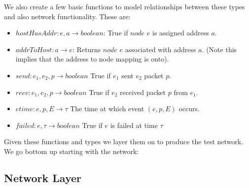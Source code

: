We also create a few basic functions to model relationships between these types and also network functionality. These
are:
\begin{itemize}
\item $hostHasAddr: e, a \rightarrow boolean$: True if $node$ $e$ is assigned address $a$.
\item $addrToHost: a \rightarrow e$: Returns $node$ $e$ associated with address $a$. (Note this implies that the address
to node mapping is onto).
\item $send: e_1, e_2, p \rightarrow boolean$ True if $e_1$ sent $e_2$ packet $p$.
\item $recv: e_1, e_2, p \rightarrow boolean$ True if $e_2$ received packet $p$ from $e_1$.
\item $etime: e, p, E \rightarrow \tau$ The time at which event $\left( e, p, E \right)$ occurs.
\item $failed: e, \tau \rightarrow boolean$ True if $e$ is failed at time $\tau$
\end{itemize}

Given these functions and types we layer them on to produce the test network. We go bottom up starting with the network:

\subsection{Network Layer}
